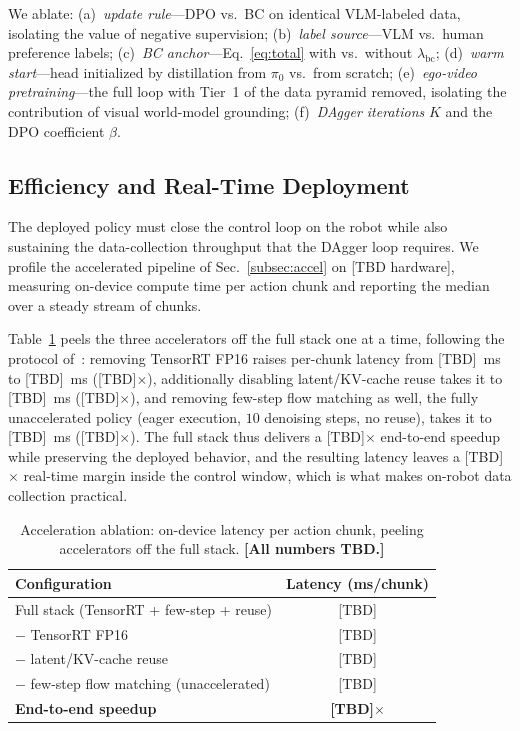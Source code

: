 \documentclass[letterpaper, 10pt, conference]{ieeeconf}
\begin{document}
We ablate: (a)~\emph{update rule}---DPO vs.\ BC on identical VLM-labeled data, isolating the value of negative supervision; (b)~\emph{label source}---VLM vs.\ human preference labels; (c)~\emph{BC anchor}---Eq.~\ref{eq:total} with vs.\ without $\lambda_{\text{bc}}$; (d)~\emph{warm start}---head initialized by distillation from $\pi_0$ vs.\ from scratch; (e)~\emph{ego-video pretraining}---the full loop with Tier~1 of the data pyramid removed, isolating the contribution of visual world-model grounding; (f)~\emph{DAgger iterations} $K$ and the DPO coefficient $\beta$.

\subsection{Efficiency and Real-Time Deployment}
\label{subsec:efficiency}

The deployed policy must close the control loop on the robot while also sustaining the data-collection throughput that the DAgger loop requires. We profile the accelerated pipeline of Sec.~\ref{subsec:accel} on [TBD hardware], measuring on-device compute time per action chunk and reporting the median over a steady stream of chunks.

Table~\ref{tab:efficiency} peels the three accelerators off the full stack one at a time, following the protocol of~\cite{yuan2026fastwam}: removing TensorRT FP16 raises per-chunk latency from [TBD]~ms to [TBD]~ms ([TBD]$\times$), additionally disabling latent/KV-cache reuse takes it to [TBD]~ms ([TBD]$\times$), and removing few-step flow matching as well, the fully unaccelerated policy (eager execution, $10$ denoising steps, no reuse), takes it to [TBD]~ms ([TBD]$\times$). The full stack thus delivers a [TBD]$\times$ end-to-end speedup while preserving the deployed behavior, and the resulting latency leaves a [TBD]$\times$ real-time margin inside the control window, which is what makes on-robot data collection practical.

\begin{table}[!htbp]
\centering
\caption{Acceleration ablation: on-device latency per action chunk, peeling accelerators off the full stack. \textbf{[All numbers TBD.]}}
\label{tab:efficiency}
\begin{tabular}{lc}
\toprule
\textbf{Configuration} & \textbf{Latency (ms/chunk)} \\
\midrule
Full stack (TensorRT + few-step + reuse) & [TBD] \\
\;\;$-$ TensorRT FP16 & [TBD] \\
\;\;$-$ latent/KV-cache reuse & [TBD] \\
\;\;$-$ few-step flow matching (unaccelerated) & [TBD] \\
\midrule
\textbf{End-to-end speedup} & \textbf{[TBD]$\times$} \\
\bottomrule
\end{tabular}
\end{table}
\end{document}

